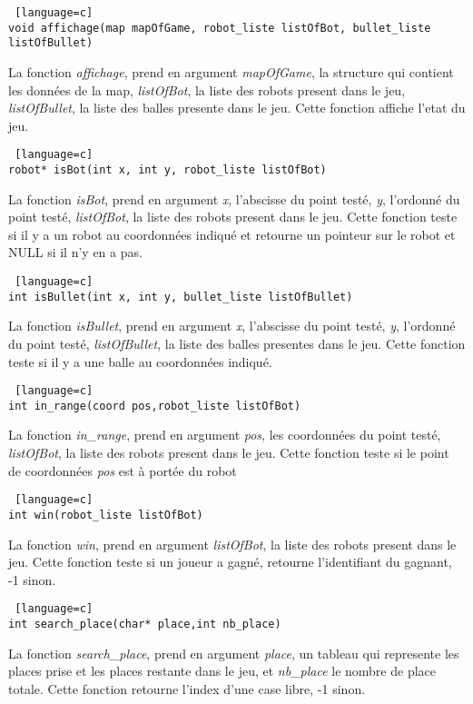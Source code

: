 \documentclass[a4paper, 11pt]{article}
\begin{document}
\begin {lstlisting} [language=c]
void affichage(map mapOfGame, robot_liste listOfBot, bullet_liste listOfBullet)
\end{lstlisting}
La fonction \emph{affichage}, prend en argument \emph{mapOfGame}, la structure qui contient les données de la map, \emph{listOfBot}, la liste des robots present dans le jeu, \emph{listOfBullet}, la liste des balles presente dans le jeu. Cette fonction affiche l'etat du jeu.\\

\begin {lstlisting} [language=c]
robot* isBot(int x, int y, robot_liste listOfBot)
\end{lstlisting}
La fonction \emph{isBot}, prend en argument \emph{x}, l'abscisse du point testé, \emph{y}, l'ordonné du point testé, \emph{listOfBot}, la liste des robots present dans le jeu. Cette fonction teste si il y a un robot au coordonnées indiqué et retourne un pointeur sur le robot et NULL si il n'y en a pas.\\

\begin {lstlisting} [language=c]
int isBullet(int x, int y, bullet_liste listOfBullet)
\end{lstlisting}
La fonction \emph{isBullet}, prend en argument \emph{x}, l'abscisse du point testé, \emph{y}, l'ordonné du point testé, \emph{listOfBullet}, la liste des balles presentes dans le jeu. Cette fonction teste si il y a une balle au coordonnées indiqué.\\

\begin {lstlisting} [language=c]
int in_range(coord pos,robot_liste listOfBot)
\end{lstlisting}
La fonction \emph{in\_range}, prend en argument \emph{pos}, les coordonnées du point testé, \emph{listOfBot}, la liste des robots present dans le jeu. Cette fonction teste si le point de coordonnées \emph{pos} est à portée du robot\\

\begin {lstlisting} [language=c]
int win(robot_liste listOfBot)
\end{lstlisting}
La fonction \emph{win}, prend en argument \emph{listOfBot}, la liste des robots present dans le jeu. Cette fonction teste si un joueur a gagné, retourne l'identifiant du gagnant, -1 sinon.\\

\begin {lstlisting} [language=c]
int search_place(char* place,int nb_place)
\end{lstlisting}
La fonction \emph{search\_place}, prend en argument \emph{place}, un tableau qui represente les places prise et les places restante dans le jeu, et \emph{nb\_place} le nombre de place totale. Cette fonction retourne l'index d'une case libre, -1 sinon.\\
\end{document}
